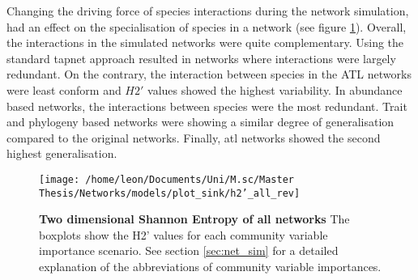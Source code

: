 \documentclass[12pt,a4paper]{article}
\begin{document}



Changing the driving force of species interactions during the network simulation, had an effect on the specialisation of species in a network (see figure \ref{fig:h2}). Overall, the interactions in the simulated networks were quite complementary. Using the standard tapnet approach resulted in networks where interactions were largely redundant. On the contrary, the interaction between species in the ATL networks were least conform and $H2'$ values showed the highest variability. In abundance based networks, the interactions between species were the most redundant. Trait and phylogeny based networks were showing a similar degree of generalisation compared to the original networks. Finally, atl networks showed the second highest generalisation.

\begin{figure}[H]
	 \centering
	 \texttt{[image: /home/leon/Documents/Uni/M.sc/Master Thesis/Networks/models/plot\_sink/h2'\_all\_rev]}
	 \captionsetup{width = .8\textwidth}
	 \caption{\textbf{Two dimensional Shannon Entropy of all networks} The boxplots show the H2' values \parencite{Bluethgen2006} for each community variable importance scenario. See section \ref{sec:net_sim} for a detailed explanation of the abbreviations of community variable importances.}
	 \label{fig:h2}
\end{figure}
\end{document}
